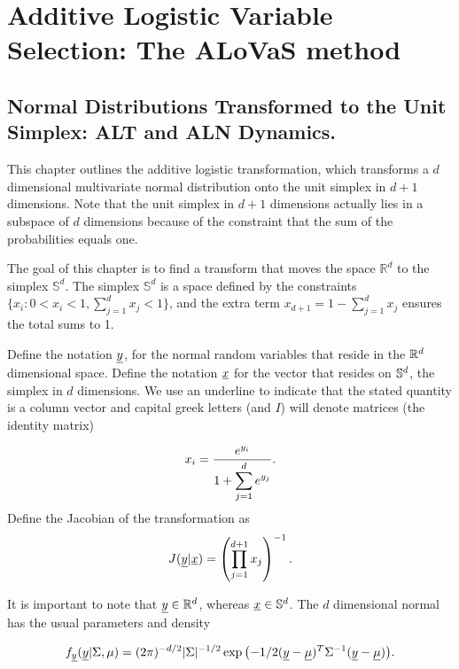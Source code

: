 \section{Additive Logistic Variable Selection: The ALoVaS method}

\subsection{Normal Distributions Transformed to the Unit Simplex: ALT and ALN Dynamics. }\label{sec:ALN_chapter}

This chapter outlines the additive logistic transformation, which transforms a $d$ dimensional multivariate normal distribution onto the unit simplex in $d+1$ dimensions. Note that the unit simplex in $d+1$ dimensions actually lies in a subspace of $d$ dimensions because of the constraint that the sum of the probabilities equals one. 

The goal of this chapter is to find a transform that moves the space $\mathbb{R}^d$  to the simplex $\mathbb{S}^d$.  The simplex $\mathbb{S}^d$ is a space defined by the constraints $\{x_i: 0<x_i<1, \sum_{j=1}^dx_j <1 \}$, and the extra term $x_{d+1}=1-\sum_{j=1}^d x_j$ ensures the total sums to 1.  

Define the notation $\underline{y}$, for the normal random variables that reside in the $\mathbb{R}^{d}$  dimensional space. Define the notation $\underline{x}$  for the vector that resides on $\mathbb{S}^{d}$, the simplex in $d$ dimensions. We use an underline to indicate that the stated quantity is a column vector and capital greek letters (and $I$) will denote matrices (the identity matrix) 

\begin{equation}\label{eqn:simplex_transform}
x_i = \frac{e^{y_i}}{1+\displaystyle{\sum_{j=1}^de^{y_j}}}. \\
\end{equation}
Define the Jacobian of the transformation as
\begin{equation}\label{eqn:jacobian}
J(\underline{y} \vert \underline{x}) = \left( \prod_{j=1}^{d+1}x_j \right)^{-1}.
\end{equation}

It is important to note that $\underline{y}\in\mathbb{R}^{d}$, whereas $\underline{x}\in\mathbb{S}^{d}$. The $d$ dimensional normal has the usual parameters and density

\begin{equation}\label{eqn:multinormal}
f_{\underline{y}}(\underline{y}\vert \Sigma, \mu)=(2\pi)^{-d/2}|\Sigma|^{-1/2}\exp{\left(-1/2(\underline{y}-\underline{\mu})^T\Sigma^{-1}(\underline{y}-\underline{\mu})\right)}.
\end{equation}

